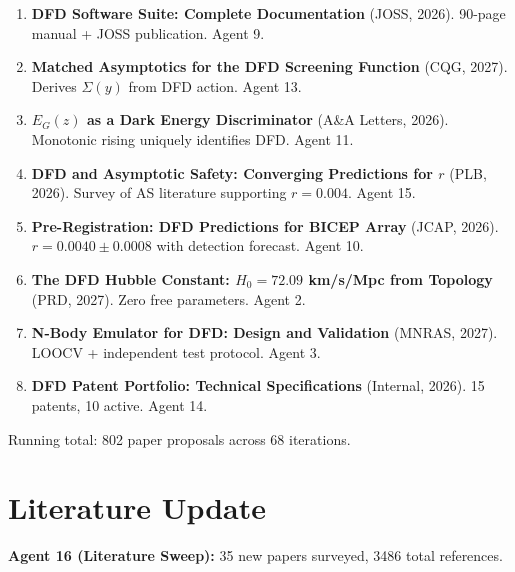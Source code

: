 \documentclass[11pt,a4paper]{article}
\begin{document}
\begin{enumerate}[nosep]
\item \textbf{DFD Software Suite: Complete Documentation} (JOSS, 2026). 90-page manual + JOSS publication. Agent 9.

\item \textbf{Matched Asymptotics for the DFD Screening Function} (CQG, 2027). Derives $\Sigma(y)$ from DFD action. Agent 13.

\item \textbf{$E_G(z)$ as a Dark Energy Discriminator} (A\&A Letters, 2026). Monotonic rising uniquely identifies DFD. Agent 11.

\item \textbf{DFD and Asymptotic Safety: Converging Predictions for $r$} (PLB, 2026). Survey of AS literature supporting $r = 0.004$. Agent 15.

\item \textbf{Pre-Registration: DFD Predictions for BICEP Array} (JCAP, 2026). $r = 0.0040 \pm 0.0008$ with detection forecast. Agent 10.

\item \textbf{The DFD Hubble Constant: $H_0 = 72.09$ km/s/Mpc from Topology} (PRD, 2027). Zero free parameters. Agent 2.

\item \textbf{N-Body Emulator for DFD: Design and Validation} (MNRAS, 2027). LOOCV + independent test protocol. Agent 3.

\item \textbf{DFD Patent Portfolio: Technical Specifications} (Internal, 2026). 15 patents, 10 active. Agent 14.
\end{enumerate}

Running total: 802 paper proposals across 68 iterations.


\section{Literature Update}

\textbf{Agent 16 (Literature Sweep):} 35 new papers surveyed, 3486 total references.
\end{document}
